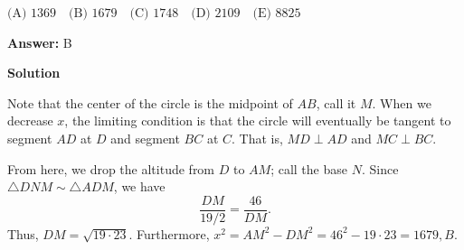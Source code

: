 \begin{enumerate}
 $\text{(A) } 1369\quad \text{(B) } 1679\quad \text{(C) } 1748\quad \text{(D) } 2109\quad \text{(E) } 8825$

 \textbf{Answer: }B



\textbf{Solution}

Note that the center of the circle is the midpoint of $AB$, call it $M$. When we decrease $x$, the limiting condition is that the circle will eventually be tangent to segment $AD$ at $D$ and segment $BC$ at $C$. That is, $MD\perp AD$ and $MC\perp BC$. 

 From here, we drop the altitude from $D$ to $AM$; call the base $N$. Since $\triangle DNM \sim \triangle ADM$, we have
 \[\frac{DM}{19/2}=\frac{46}{DM}.\]Thus, $DM=\sqrt{19\cdot 23}$. Furthermore, $x^2=AM^2-DM^2=46^2-19\cdot 23=1679, \boxed{B}.$



\end{enumerate}